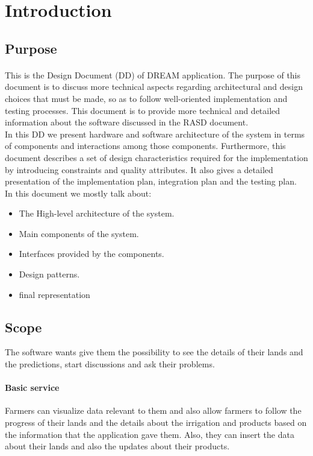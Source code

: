 \section{Introduction}

\subsection{Purpose}
\paragraph{}
This is the Design Document (DD) of DREAM application. The purpose of this document is to discuss more technical aspects regarding architectural and design choices that must be made, so as to follow well-oriented implementation and testing processes. This document is to provide more technical and detailed information about the software discussed in the RASD document.\\
In this DD we present hardware and software architecture of the system in terms of components and interactions among those components. Furthermore, this document describes a set of design characteristics required for the implementation by introducing constraints and quality attributes.
It also gives a detailed presentation of the implementation plan, integration plan and the testing plan.\\
In this document we mostly talk about:
\begin{itemize}
    \item The High-level architecture of the system.
    \item Main components of the system.
    \item Interfaces provided by the components.
    \item Design patterns.
    \item final representation 
\end{itemize}

\subsection{Scope}

The software wants give them the possibility to see the details of their lands and the predictions, start discussions and ask their problems.
\paragraph{Basic service} Farmers can visualize data relevant to them and also allow farmers to follow the progress of their lands and the details about the irrigation and products based on the information that the application gave them. Also, they can insert the data about their lands and also the updates about their products.

